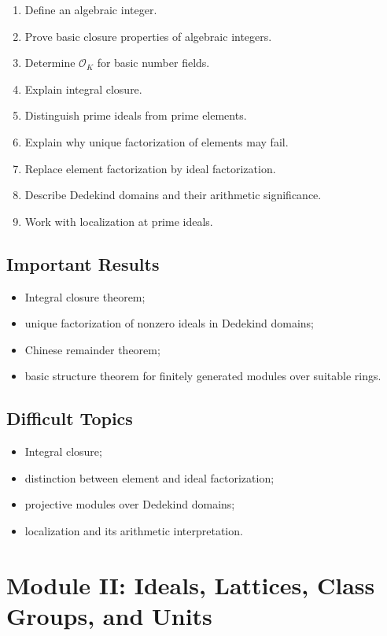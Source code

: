 \documentclass[11pt,a4paper]{article}
\newcommand{\OK}{\mathcal O_K}
\begin{document}
\begin{enumerate}
    \item Define an algebraic integer.
    \item Prove basic closure properties of algebraic integers.
    \item Determine \(\OK\) for basic number fields.
    \item Explain integral closure.
    \item Distinguish prime ideals from prime elements.
    \item Explain why unique factorization of elements may fail.
    \item Replace element factorization by ideal factorization.
    \item Describe Dedekind domains and their arithmetic significance.
    \item Work with localization at prime ideals.
\end{enumerate}

\subsection{Important Results}

\begin{itemize}
    \item Integral closure theorem;
    \item unique factorization of nonzero ideals in Dedekind domains;
    \item Chinese remainder theorem;
    \item basic structure theorem for finitely generated modules
    over suitable rings.
\end{itemize}

\subsection{Difficult Topics}

\begin{itemize}
    \item Integral closure;
    \item distinction between element and ideal factorization;
    \item projective modules over Dedekind domains;
    \item localization and its arithmetic interpretation.
\end{itemize}

\section{Module II: Ideals, Lattices, Class Groups, and Units}
\end{document}
